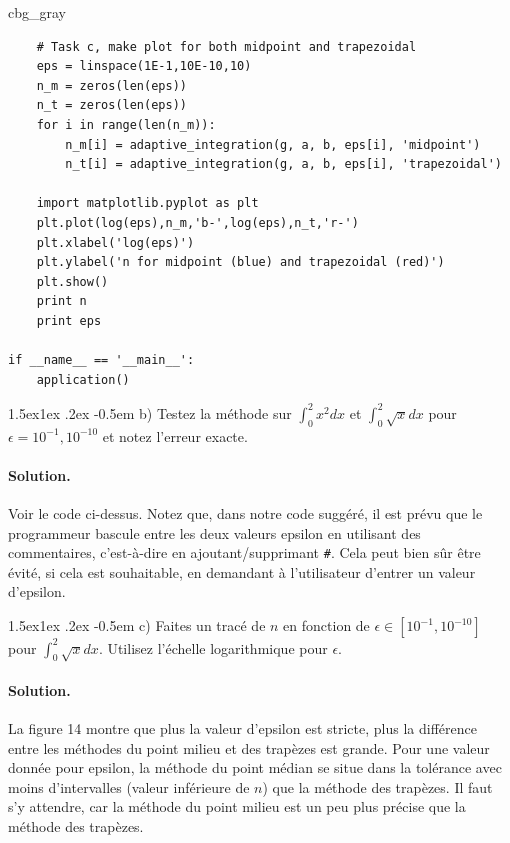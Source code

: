 \documentclass[%
oneside,                 %
final,                   %
10pt,french]{article}
\makeatletter
\newenvironment{_cod_tight}[1]{
   \def\FrameCommand{\colorbox{#1}}
   \FrameRule0.6pt\MakeFramed {\FrameRestore}\vskip3mm}
   {\vskip0mm\endMakeFramed}
\newenvironment{cod}[1]{
\bgroup\rmfamily
\fboxsep=0mm\relax
\begin{_cod_tight}{#1}
\list{}{\parsep=-2mm\parskip=0mm\topsep=0pt\leftmargin=2mm
\rightmargin=2\leftmargin\leftmargin=4pt\relax}
\item\relax}
{\endlist\end{_cod_tight}\egroup}
\newenvironment{doconceexercise}{}{}
\newcommand\subex{\@startsection{paragraph}{4}{\z@}%
                  {1.5ex\@plus1ex \@minus.2ex}%
                  {-0.5em}%
                  {\normalfont\normalsize\bfseries}}
\makeatother
\begin{document}
\begin{doconceexercise}
\begin{cod}{cbg_gray}
\begin{verbatim}
    # Task c, make plot for both midpoint and trapezoidal
    eps = linspace(1E-1,10E-10,10)
    n_m = zeros(len(eps))
    n_t = zeros(len(eps))
    for i in range(len(n_m)):
        n_m[i] = adaptive_integration(g, a, b, eps[i], 'midpoint')
        n_t[i] = adaptive_integration(g, a, b, eps[i], 'trapezoidal')

    import matplotlib.pyplot as plt
    plt.plot(log(eps),n_m,'b-',log(eps),n_t,'r-')
    plt.xlabel('log(eps)')
    plt.ylabel('n for midpoint (blue) and trapezoidal (red)')
    plt.show()
    print n
    print eps

if __name__ == '__main__':
    application()

\end{verbatim}
\end{cod}
\noindent


\subex{b)}
Testez la méthode sur $\int_0^2x^2dx$ et $\int_0^2\sqrt{x}dx$ pour $\epsilon = 10^{−1},10^{−10}$ et notez l'erreur exacte.


\paragraph{Solution.}
Voir le code ci-dessus. Notez que, dans notre code suggéré, il est prévu que le programmeur bascule entre les deux valeurs epsilon en utilisant des commentaires, c'est-à-dire en ajoutant/supprimant \Verb!#!. Cela peut bien sûr être évité, si cela est souhaitable, en demandant à l'utilisateur d'entrer un valeur d'epsilon.


\subex{c)}
Faites un tracé de $n$ en fonction de $\epsilon \in [10^{-1}, 10^{-10}]$ pour $\int_0^2\sqrt{x}dx$. Utilisez l'échelle logarithmique pour $\epsilon$.


\paragraph{Solution.}
La figure 14 montre que plus la valeur d'epsilon est stricte, plus la différence entre les méthodes du point milieu et des trapèzes est grande. Pour une valeur donnée pour epsilon, la méthode du point médian se situe dans la tolérance avec moins d'intervalles (valeur inférieure de $n$) que la méthode des trapèzes. Il faut s'y attendre, car la méthode du point milieu est un peu plus précise que la méthode des trapèzes.


\end{doconceexercise}
\end{document}
